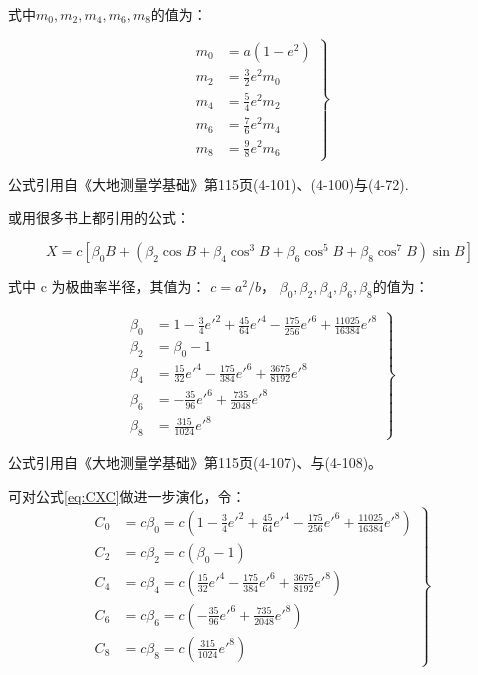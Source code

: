\begin{enumerate}
式中$m_0, m_2, m_4, m_6, m_8$的值为：

\begin{equation}
\left . 
\begin{aligned}
m_0 &= a(1-e^2) \\
m_2 &= \frac{3}{2}e^2 m_0  \\
m_4 &= \frac{5}{4}e^2 m_2   \\
m_6 &= \frac{7}{6}e^2 m_4   \\
m_8 &= \frac{9}{8}e^2 m_6
\end{aligned} 
\right \}
\end{equation}

公式引用自《大地测量学基础》第115页(4-101)、(4-100)与(4-72).

或用很多书上都引用的公式：

\begin{equation}
\label{eq:CX}
X=c[\beta_0 B + (\beta_2 \cos B + \beta_4 \cos^3 B + \beta_6 \cos^5 B + \beta_8 \cos^7 B) \sin B] 
\end{equation}

式中 c 为极曲率半径，其值为： $c= a^2 / b$，
$\beta_0, \beta_2, \beta_4, \beta_6, \beta_8$的值为：

\begin{equation}
\label{eq:CXC}
\left .
\begin{aligned}
\beta_0 &= 1 - \frac{3}{4}e'^2 + \frac{45}{64}e'^4 - \frac{175}{256}e'^6 + \frac{11025}{16384}e'^8  \\
\beta_2 &= \beta_0 -1  \\
\beta_4 &= \frac{15}{32}e'^4 - \frac{175}{384}e'^6 + \frac{3675}{8192}e'^8   \\
\beta_6 &= -\frac{35}{96}e'^6 + \frac{735}{2048}e'^8   \\
\beta_8 &= \frac{315}{1024}e'^8
\end{aligned} 
\right \}
\end{equation}

公式引用自《大地测量学基础》第115页(4-107)、与(4-108)。

可对公式\ref{eq:CXC}做进一步演化，令：
\begin{equation}
	\label{eq:CXCC}
	\left .
	\begin{aligned}
		C_0 &= c \beta_0 = c(1 - \frac{3}{4}e'^2 + \frac{45}{64}e'^4 - \frac{175}{256}e'^6 + \frac{11025}{16384}e'^8) \\
		C_2 &= c \beta_2 = c(\beta_0 -1)                                                                              \\
		C_4 &= c \beta_4 = c(\frac{15}{32}e'^4 - \frac{175}{384}e'^6 + \frac{3675}{8192}e'^8)                         \\
		C_6 &= c \beta_6 = c(-\frac{35}{96}e'^6 + \frac{735}{2048}e'^8)                                               \\
		C_8 &= c \beta_8 = c(\frac{315}{1024}e'^8)
	\end{aligned}
	\right \}
\end{equation}


\end{enumerate}
